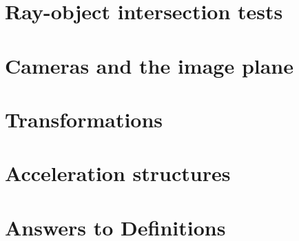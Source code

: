\documentclass{article}
\begin{document}
\section{Ray-object intersection tests}
\label{sec:isects}



\section{Cameras and the image plane}
\label{sec:cameras}


\section{Transformations}
\label{sec:transform}


\section{Acceleration structures}
\label{sec:accel}


\section{Answers to Definitions}





\end{document}
